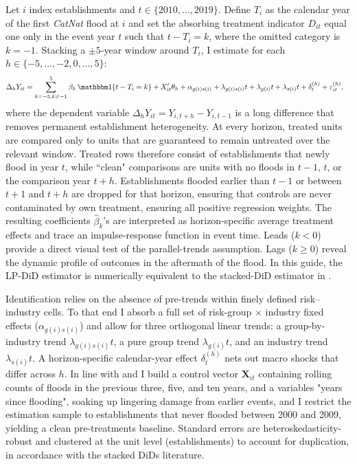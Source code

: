 Let $i$ index establishments and $t\in\{2010,\dots,2019\}$. Define $T_i$ as the calendar year of the first \textit{CatNat} flood at $i$ and set the absorbing treatment indicator
$D_{it}$ equal one only in the event year $t$ such that $t-T_i=k$, where the omitted category is $k=-1$. Stacking a $\pm5$‑year window around $T_i$, I estimate for each
$h\in\{-5,\dots,-2,0,\dots,5\}$:
\begin{align*}
\Delta_h Y_{it}
&=\sum_{k=-5,k\neq-1}^{5}\beta_k\,
      \mathbbm 1\{t-T_i=k\}
  +X_{it}'\theta_h
  +\alpha_{g(i)s(i)}
  +\lambda_{g(i)s(i)}t
  +\lambda_{g(i)}t
  +\lambda_{s(i)}t
  +\delta_t^{(h)}
  +\varepsilon_{it}^{(h)},       
\end{align*}
where the dependent variable $\Delta_h Y_{it}=Y_{i,t+h}-Y_{i,t-1}$ is a long difference that removes permanent establishment heterogeneity. At every horizon, treated units are compared only to units that are guaranteed to remain untreated over the relevant window. Treated rows therefore consist of establishments that newly flood in year $t$, while ``clean" comparisons are units with no floods in $t-1$, $t$, or the comparison year $t+h$. Establishments flooded earlier than $t-1$ or between $t+1$ and $t+h$ are dropped for that horizon, ensuring that controls are never contaminated by own treatment, ensuring all positive regression weights. The resulting coefficients $\hat\beta_k$’s are interpreted as horizon-specific average treatment effects and trace an impulse-response function in event time. Leads ($k<0$) provide a direct visual test of the parallel-trends assumption. Lags ($k\ge 0$) reveal the dynamic profile of outcomes in the aftermath of the flood. In this guide, the LP-DiD estimator is numerically equivalent to the stacked-DiD estimator in \cite{wing2024stacked}.

Identification relies on the absence of pre-trends within finely defined risk–industry cells. To that end I absorb a full set of risk-group $\times$ industry fixed effects ($\alpha_{g(i)s(i)}$) and allow for three orthogonal linear trends: a group-by-industry trend $\lambda_{g(i)s(i)}t$, a pure group trend $\lambda_{g(i)}t$, and an industry trend $\lambda_{s(i)}t$. A horizon-specific calendar-year effect $\delta_t^{(h)}$ nets out macro shocks that differ across $h$. In line with \cite{patel2023floods} and \cite{hussain2024flooding} I build a control vector $\mathbf X_{it}$ containing rolling counts of floods in the previous three, five, and ten years, and a variables "years since flooding", soaking up lingering damage from earlier events, and I restrict the estimation sample to establishments that never flooded between 2000 and 2009, yielding a clean pre-treatments baseline. Standard errors are heteroskedasticity-robust and clustered at the unit level (establishments) to account for duplication, in accordance with the stacked DiDs literature.







